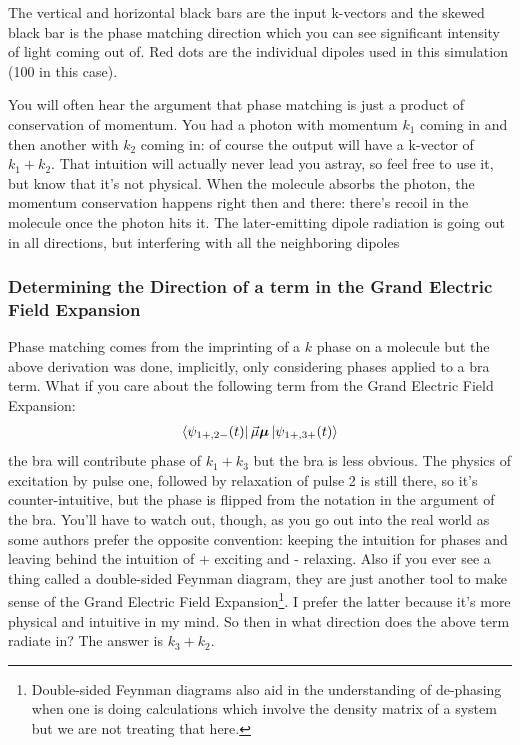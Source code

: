 The vertical and horizontal black bars are the input k-vectors and the skewed black bar is the phase matching direction which you can see significant intensity of light coming out of.  Red dots are the individual dipoles used in this simulation (100 in this case).

You will often hear the argument that phase matching is just a product of conservation of momentum.  You had a photon with momentum $k_1$ coming in and then another with $k_2$ coming in: of course the output will have a k-vector of $k_1 + k_2$.  That intuition will actually never lead you astray, so feel free to use it, but know that it's not physical.  When the molecule absorbs the photon, the momentum conservation happens right then and there: there's recoil in the molecule once the photon hits it.  The later-emitting dipole radiation is going out in all directions, but interfering with all the neighboring dipoles

\subsubsection{Determining the Direction of a term in the Grand Electric Field Expansion}
Phase matching comes from the imprinting of a $k$ phase on a molecule but the above derivation was done, implicitly, only considering phases applied to a bra term.  What if you care about the following term from the Grand Electric Field Expansion:
\begin{align*}
	\bra{\psi_{1+, 2-} (t)} \vec{\mu} \boldsymbol{\mu} \ket{\psi_{1+,3+} (t)}
\end{align*}
the bra will contribute phase of $k_1 + k_3$ but the bra is less obvious.  The physics of excitation by pulse one, followed by relaxation of pulse 2 is still there, so it's counter-intuitive, but the phase is flipped from the notation in the argument of the bra.  You'll have to watch out, though, as you go out into the real world as some authors prefer the opposite convention: keeping the intuition for phases and leaving behind the intuition of + exciting and - relaxing.  Also if you ever see a thing called a double-sided Feynman diagram, they are just another tool to make sense of the Grand Electric Field Expansion\footnote{Double-sided Feynman diagrams also aid in the understanding of de-phasing when one is doing calculations which involve the density matrix of a system but we are not treating that here.}. I prefer the latter because it's more physical and intuitive in my mind.  So then in what direction does the above term radiate in?  The answer is $k_3  + k_2$.


